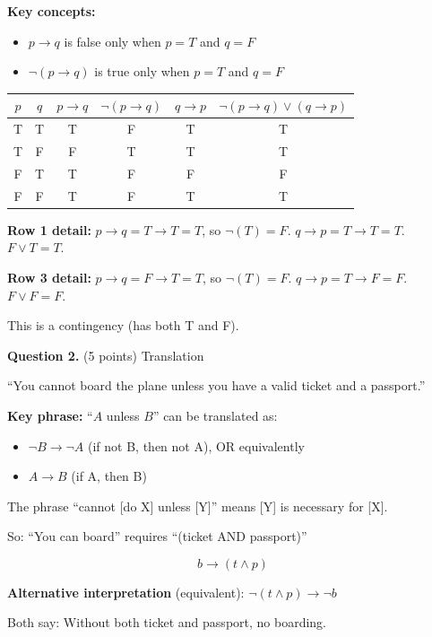 \documentclass[11pt,a4paper]{article}
\begin{document}
\begin{solnbox}
\textbf{Key concepts:}
\begin{itemize}[noitemsep]
    \item $p \to q$ is false only when $p = T$ and $q = F$
    \item $\neg(p \to q)$ is true only when $p = T$ and $q = F$
\end{itemize}

\begin{center}
\begin{tabular}{cc|c|c|c|c}
\toprule
$p$ & $q$ & $p \to q$ & $\neg(p \to q)$ & $q \to p$ & $\neg(p \to q) \lor (q \to p)$ \\
\midrule
T & T & T & F & T & T \\
T & F & F & T & T & T \\
F & T & T & F & F & F \\
F & F & T & F & T & T \\
\bottomrule
\end{tabular}
\end{center}

\textbf{Row 1 detail:} $p \to q = T \to T = T$, so $\neg(T) = F$. $q \to p = T \to T = T$. $F \lor T = T$.

\textbf{Row 3 detail:} $p \to q = F \to T = T$, so $\neg(T) = F$. $q \to p = T \to F = F$. $F \lor F = F$.

This is a contingency (has both T and F).
\end{solnbox}

\vspace{15pt}

\textbf{Question 2.} (5 points) Translation

\begin{solnbox}
``You cannot board the plane unless you have a valid ticket and a passport.''

\textbf{Key phrase:} ``$A$ unless $B$'' can be translated as:
\begin{itemize}[noitemsep]
    \item $\neg B \to \neg A$ (if not B, then not A), OR equivalently
    \item $A \to B$ (if A, then B)
\end{itemize}

The phrase ``cannot [do X] unless [Y]'' means [Y] is necessary for [X].

So: ``You can board'' requires ``(ticket AND passport)''

$$\boxed{b \to (t \land p)}$$

\textbf{Alternative interpretation} (equivalent): $\neg(t \land p) \to \neg b$

Both say: Without both ticket and passport, no boarding.
\end{solnbox}
\end{document}
